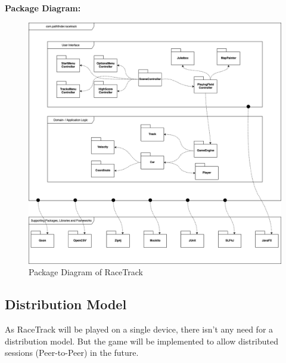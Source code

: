 		\newpage
		
		\textbf{Package Diagram:} \\
			\begin{figure}[H]
				\centering
				\includegraphics[width=16cm,keepaspectratio,center]{img/Software-Architecture_UML-Package-Diagram.png}
				\caption{Package Diagram of RaceTrack}
			\end{figure}

		\subsection{Distribution Model}
		As RaceTrack will be played on a single device, there isn't any need for a distribution model. But the game will be implemented to allow distributed sessions (Peer-to-Peer) in the future.
